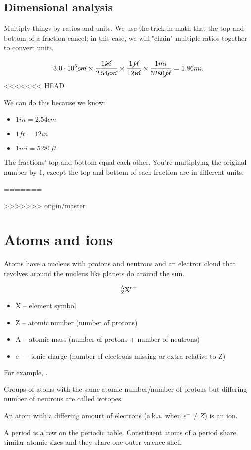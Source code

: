 \documentclass[letterpaper, 12pt]{article}
\begin{document}
	\subsection{Dimensional analysis}
	Multiply things by ratios and units. We use the trick in math that the top and bottom of a fraction cancel; in this case, we will "chain" multiple ratios together to convert units.

	$$3.0 \cdot 10^5 \cancel{cm} \times \frac{1 \cancel{in}}{2.54 \cancel{cm}} \times \frac{1 \cancel{ft}}{12 \cancel{in}} \times \frac{1 mi}{5280 \cancel{ft}} = 1.86 mi.$$
<<<<<<< HEAD
	
	We can do this because we know:
	\begin{itemize}
		\item $1 in = 2.54 cm$
		\item $1 ft = 12 in$
		\item $1 mi = 5280 ft$
	\end{itemize}
	The fractions' top and bottom equal each other. You're multiplying the original number by 1, except the top and bottom of each fraction are in different units.
	
=======

>>>>>>> origin/master
\section{Atoms and ions}
Atoms have a nucleus with protons and neutrons and an electron cloud that revolves around the nucleus like planets do around the sun.

$$\ce{^{A}_{Z}X^{e-}}$$

\begin{itemize}
	\item X -- element symbol
	\item Z -- atomic number (number of protons)
	\item A -- atomic mass (number of protons + number of neutrons)
	\item e$^{-}$ -- ionic charge (number of electrons missing or extra relative to Z)
\end{itemize}

For example, .

Groups of atoms with the same atomic number/number of protons but differing number of neutrons are called isotopes.

An atom with a differing amount of electrons (a.k.a. when $e^{-} \neq Z$) is an ion.

A period is a row on the periodic table. Constituent atoms of a period share similar atomic sizes and they share one outer valence shell.
\end{document}
